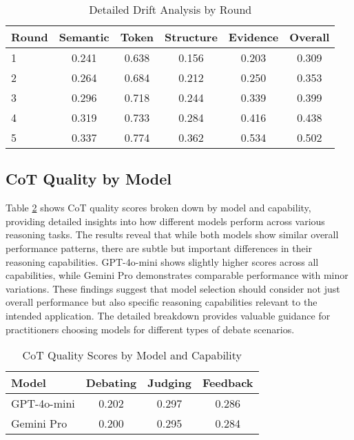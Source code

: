 \documentclass[11pt]{article}
\begin{document}
\begin{table}[h]
\centering
\caption{Detailed Drift Analysis by Round}
\label{tab:detailed_drift}
\begin{tabular}{lccccc}
\toprule
Round & Semantic & Token & Structure & Evidence & Overall \\
\midrule
1 & 0.241 & 0.638 & 0.156 & 0.203 & 0.309 \\
2 & 0.264 & 0.684 & 0.212 & 0.250 & 0.353 \\
3 & 0.296 & 0.718 & 0.244 & 0.339 & 0.399 \\
4 & 0.319 & 0.733 & 0.284 & 0.416 & 0.438 \\
5 & 0.337 & 0.774 & 0.362 & 0.534 & 0.502 \\
\bottomrule
\end{tabular}
\end{table}

\subsection{CoT Quality by Model}

Table \ref{tab:cot_by_model} shows CoT quality scores broken down by model and capability, providing detailed insights into how different models perform across various reasoning tasks. The results reveal that while both models show similar overall performance patterns, there are subtle but important differences in their reasoning capabilities. GPT-4o-mini shows slightly higher scores across all capabilities, while Gemini Pro demonstrates comparable performance with minor variations. These findings suggest that model selection should consider not just overall performance but also specific reasoning capabilities relevant to the intended application. The detailed breakdown provides valuable guidance for practitioners choosing models for different types of debate scenarios.

\begin{table}[h]
\centering
\caption{CoT Quality Scores by Model and Capability}
\label{tab:cot_by_model}
\begin{tabular}{lccc}
\toprule
Model & Debating & Judging & Feedback \\
\midrule
GPT-4o-mini & 0.202 & 0.297 & 0.286 \\
Gemini Pro & 0.200 & 0.295 & 0.284 \\
\bottomrule
\end{tabular}
\end{table}

\newpage
\end{document}
